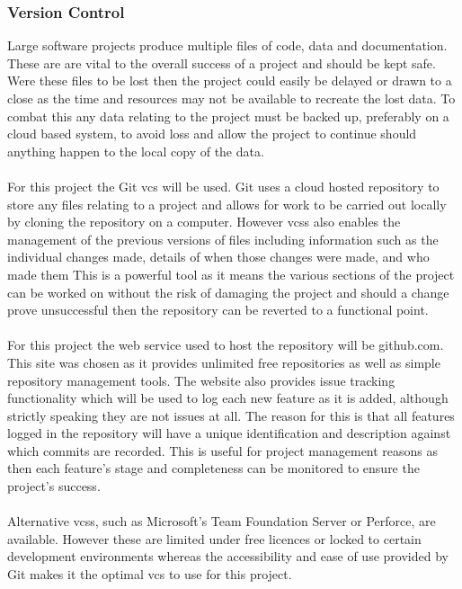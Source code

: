		\subsubsection{Version Control}\label{sec:methodology_version_control}
			Large software projects produce multiple files of code, data and documentation. These are are vital to the overall success of a project and should be kept safe. Were these files to be lost then the project could easily be delayed or drawn to a close as the time and resources may not be available to recreate the lost data. To combat this any data relating to the project must be backed up, preferably on a cloud based system, to avoid loss and allow the project to continue should anything happen to the local copy of the data.
			\\\\
			For this project the Git \gls{vcs} will be used. Git uses a cloud hosted repository to store any files relating to a project and allows for work to be carried out locally by cloning the repository on a computer. However \glspl{vcs} also enables the management of the previous versions of files including information such as the individual changes made, details of when those changes were made, and who made them This is a powerful tool as it means the various sections of the project can be worked on without the risk of damaging the project and should a change prove unsuccessful then the repository can be reverted to a functional point.
			\\\\
			For this project the web service used to host the repository will be github.com. This site was chosen as it provides unlimited free repositories as well as simple repository management tools. The website also provides issue tracking functionality which will be used to log each new feature as it is added, although strictly speaking they are not issues at all. The reason for this is that all features logged in the repository will have a unique identification and description against which commits are recorded. This is useful for project management reasons as then each feature’s stage and completeness can be monitored to ensure the project’s success.
			\\\\
			Alternative \glspl{vcs}, such as Microsoft’s Team Foundation Server or Perforce, are available. However these are limited under free licences or locked to certain development environments whereas the accessibility and ease of use provided by Git makes it the optimal \gls{vcs} to use for this project.
